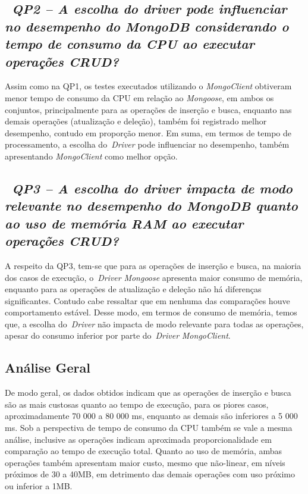 \documentclass[12pt]{article}
\begin{document}
\subsection{~\emph{QP2 -- A escolha do driver pode influenciar no desempenho do MongoDB considerando o tempo de consumo da CPU ao executar operações CRUD?}}
\label{q2}

Assim como na QP1, os testes executados utilizando o \emph{MongoClient} obtiveram menor tempo de consumo da CPU em relação ao \emph{Mongoose}, em ambos os conjuntos, principalmente para as operações de inserção e busca, enquanto nas demais operações (atualização e deleção), também foi registrado melhor desempenho, contudo em proporção menor.
Em suma, em termos de tempo de processamento, a escolha do~\emph{Driver} pode influenciar no desempenho, também apresentando \emph{MongoClient} como melhor opção.

\subsection{~\emph{QP3 -- A escolha do driver impacta de modo relevante no desempenho do MongoDB quanto ao uso de memória RAM ao executar operações CRUD?}}
\label{q3}

A respeito da QP3, tem-se que para as operações de inserção e busca, na maioria dos casos de execução, o~\emph{Driver} \emph{Mongoose} apresenta maior consumo de memória, enquanto para as operações de atualização e deleção não há diferenças significantes.
Contudo cabe ressaltar que em nenhuma das comparações houve comportamento estável.
Desse modo, em termos de consumo de memória, temos que, a escolha do~\emph{Driver} não impacta de modo relevante para todas as operações, apesar do consumo inferior por parte do~\emph{Driver} \emph{MongoClient}.

\subsection{Análise Geral}
\label{qgeral}

De modo geral, os dados obtidos indicam que as operações de inserção e busca são as mais custosas quanto ao tempo de execução, para os piores casos, aproximadamente 70 000 a 80 000 ms, enquanto as demais são inferiores a 5 000 ms.
Sob a perspectiva de tempo de consumo da CPU também se vale a mesma análise, inclusive as operações indicam aproximada proporcionalidade em comparação ao tempo de execução total.
Quanto ao uso de memória, ambas operações também apresentam maior custo, mesmo que não-linear, em níveis próximos de 30 a 40MB, em detrimento das demais operações com uso próximo ou inferior a 1MB.
\end{document}
